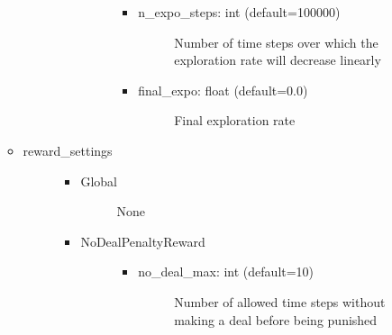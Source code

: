 \documentclass[letterpaper,10pt,english]{sphinxmanual}
\begin{document}
\begin{itemize}
\begin{description}
\begin{itemize}
\begin{description}
\begin{itemize}
\begin{description}
\begin{itemize}
\item {} \begin{description}
\item[{n\_expo\_steps: int (default=100000)}] \leavevmode
\sphinxAtStartPar
Number of time steps over which the exploration rate will decrease linearly

\end{description}

\item {} \begin{description}
\item[{final\_expo: float (default=0.0)}] \leavevmode
\sphinxAtStartPar
Final exploration rate

\end{description}

\end{itemize}

\end{description}

\end{itemize}

\end{description}

\item {} \begin{description}
\item[{reward\_settings}] \leavevmode\begin{itemize}
\item {} \begin{description}
\item[{Global}] \leavevmode
\sphinxAtStartPar
None

\end{description}

\item {} \begin{description}
\item[{NoDealPenaltyReward}] \leavevmode\begin{itemize}
\item {} \begin{description}
\item[{no\_deal\_max: int (default=10)}] \leavevmode
\sphinxAtStartPar
Number of allowed time steps without making a deal before being punished

\end{description}

\end{itemize}

\end{description}


\end{itemize}
\end{description}
\end{itemize}
\end{description}
\end{itemize}
\end{document}
